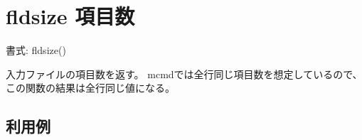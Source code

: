 
%

\section{fldsize 項目数\label{sect:fldsize}}

書式: fldsize()

入力ファイルの項目数を返す。
mcmdでは全行同じ項目数を想定しているので、この関数の結果は全行同じ値になる。

\subsection*{利用例}


%

